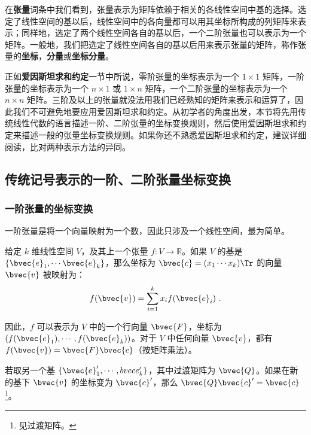 

在\textbf{张量}词条中我们看到，张量表示为矩阵依赖于相关的各线性空间中基的选择。选定了线性空间的基以后，线性空间中的各向量都可以用其坐标所构成的列矩阵来表示；同样地，选定了两个线性空间各自的基以后，一个二阶张量也可以表示为一个矩阵。一般地，我们把选定了线性空间各自的基以后用来表示张量的矩阵，称作张量的\textbf{坐标}，\textbf{分量}或\textbf{坐标分量}。

正如\textbf{爱因斯坦求和约定}一节中所说，零阶张量的坐标表示为一个 $1\times 1$ 矩阵，一阶张量的坐标表示为一个 $n\times 1$ 或 $1\times n$ 矩阵，一个二阶张量的坐标表示为一个 $n\times n$ 矩阵。三阶及以上的张量就没法用我们已经熟知的矩阵来表示和运算了，因此我们不可避免地要应用爱因斯坦求和约定。从初学者的角度出发，本节将先用传统线性代数的语言描述一阶、二阶张量的坐标变换规则，然后使用爱因斯坦求和约定来描述一般的张量坐标变换规则。如果你还不熟悉爱因斯坦求和约定，建议详细阅读，比对两种表示方法的异同。

\subsection{传统记号表示的一阶、二阶张量坐标变换}
\subsubsection{一阶张量的坐标变换}
一阶张量是将一个向量映射为一个数，因此只涉及一个线性空间，最为简单。

给定 $k$ 维线性空间 $V$，及其上一个张量 $f:V\rightarrow\mathbb{R}$。如果 $V$ 的基是 $\{\bvec{e}_1, \cdots\bvec{e}_k\}$，那么坐标为 $\bvec{c}=(x_1\cdots x_k)\Tr$ 的向量 $\bvec{v}$ 被映射为：
\begin{equation}
f(\bvec{v})=\sum\limits_{i=1}^k x_if(\bvec{e}_i)~.
\end{equation}

因此，$f$ 可以表示为 $V$ 中的一个行向量 $\bvec{F}$，坐标为 $(f(\bvec{e}_1), \cdots, f(\bvec{e}_k))$。对于 $V$ 中任何向量 $\bvec{v}$，都有 $f(\bvec{v})=\bvec{F}\bvec{c}$（按矩阵乘法）。

若取另一个基 $\{\bvec{e}_1', \cdots, \\bvec{e}_k'\}$，其中过渡矩阵为 $\bvec{Q}$。如果在新的基下 $\bvec{v}$ 的坐标变为 $\bvec{c}'$，那么 $\bvec{Q}\bvec{c}'=\bvec{c}$\footnote{见过渡矩阵。}。

